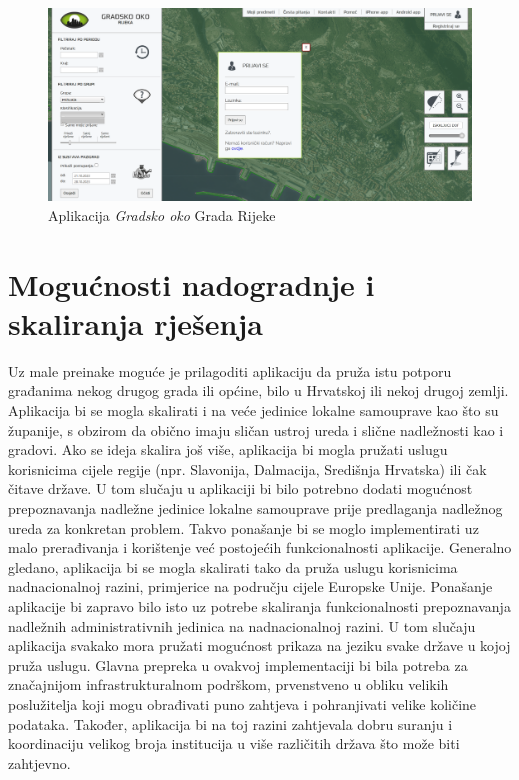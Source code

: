 		\begin{figure}[H]
			\includegraphics[width=\textwidth]{slike/GradskoOko.PNG}
			\caption{Aplikacija \textit{Gradsko oko} Grada Rijeke}
			\label{fig:gradskooko} %
		\end{figure}
		
		\eject
		
		\section{Mogućnosti nadogradnje i skaliranja rješenja} 
		
		Uz male preinake moguće je prilagoditi aplikaciju da pruža istu potporu građanima nekog drugog grada ili općine, bilo u Hrvatskoj ili nekoj drugoj zemlji. Aplikacija bi se mogla skalirati i na veće jedinice lokalne samouprave kao što su županije, s obzirom da obično imaju sličan ustroj ureda i slične nadležnosti kao i gradovi. Ako se ideja skalira još više, aplikacija bi mogla pružati uslugu korisnicima cijele regije (npr. Slavonija, Dalmacija, Središnja Hrvatska) ili čak čitave države. U tom slučaju u aplikaciji bi bilo potrebno dodati mogućnost prepoznavanja nadležne jedinice lokalne samouprave prije predlaganja nadležnog ureda za konkretan problem. Takvo ponašanje bi se moglo implementirati uz malo prerađivanja i korištenje već postojećih funkcionalnosti aplikacije. Generalno gledano, aplikacija bi se mogla skalirati tako da pruža uslugu korisnicima nadnacionalnoj razini, primjerice na području cijele Europske Unije. Ponašanje aplikacije bi zapravo bilo isto uz potrebe skaliranja funkcionalnosti prepoznavanja nadležnih administrativnih jedinica na nadnacionalnoj razini. U tom slučaju aplikacija svakako mora pružati mogućnost prikaza na jeziku svake države u kojoj pruža uslugu. Glavna prepreka u ovakvoj implementaciji bi bila potreba za značajnijom infrastrukturalnom podrškom, prvenstveno u obliku velikih poslužitelja koji mogu obrađivati puno zahtjeva i pohranjivati velike količine podataka. Također, aplikacija bi na toj razini zahtjevala dobru suranju i koordinaciju velikog broja institucija u više različitih država što može biti zahtjevno.
		
		\eject
		